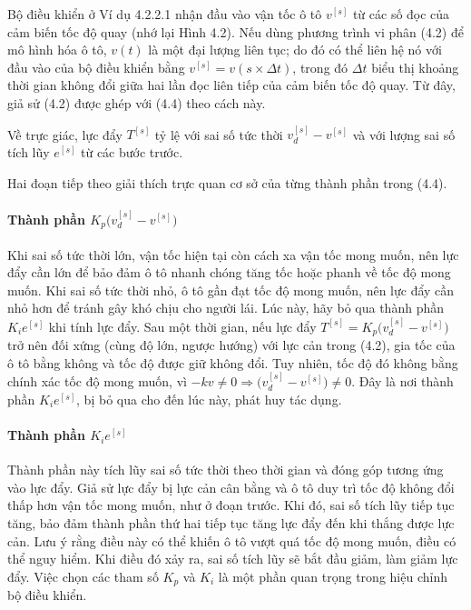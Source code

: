 Bộ điều khiển ở Ví dụ 4.2.2.1 nhận đầu vào vận tốc ô tô $v^{[s]}$ từ các số đọc của cảm biến tốc độ quay (nhớ lại Hình 4.2). Nếu dùng phương trình vi phân (4.2) để mô hình hóa ô tô, $v(t)$ là một đại lượng liên tục; do đó có thể liên hệ nó với đầu vào của bộ điều khiển bằng $v^{[s]}=v(s\times\Delta t)$, trong đó $\Delta t$ biểu thị khoảng thời gian không đổi giữa hai lần đọc liên tiếp của cảm biến tốc độ quay. Từ đây, giả sử (4.2) được ghép với (4.4) theo cách này.

Về trực giác, lực đẩy $T^{[s]}$ tỷ lệ với sai số tức thời $v_d^{[s]}-v^{[s]}$ và với lượng sai số tích lũy $e^{[s]}$ từ các bước trước.

Hai đoạn tiếp theo giải thích trực quan cơ sở của từng thành phần trong (4.4).

\paragraph{Thành phần $K_p\bigl(v_d^{[s]}-v^{[s]}\bigr)$}
Khi sai số tức thời lớn, vận tốc hiện tại còn cách xa vận tốc mong muốn, nên lực đẩy cần lớn để bảo đảm ô tô nhanh chóng tăng tốc hoặc phanh về tốc độ mong muốn. Khi sai số tức thời nhỏ, ô tô gần đạt tốc độ mong muốn, nên lực đẩy cần nhỏ hơn để tránh gây khó chịu cho người lái. Lúc này, hãy bỏ qua thành phần $K_i e^{[s]}$ khi tính lực đẩy. Sau một thời gian, nếu lực đẩy $T^{[s]}=K_p\bigl(v_d^{[s]}-v^{[s]}\bigr)$ trở nên đối xứng (cùng độ lớn, ngược hướng) với lực cản trong (4.2), gia tốc của ô tô bằng không và tốc độ được giữ không đổi. Tuy nhiên, tốc độ đó không bằng chính xác tốc độ mong muốn, vì $-kv\ne0\Longrightarrow\bigl(v_d^{[s]}-v^{[s]}\bigr)\ne0$. Đây là nơi thành phần $K_i e^{[s]}$, bị bỏ qua cho đến lúc này, phát huy tác dụng.

\paragraph{Thành phần $K_i e^{[s]}$}
Thành phần này tích lũy sai số tức thời theo thời gian và đóng góp tương ứng vào lực đẩy. Giả sử lực đẩy bị lực cản cân bằng và ô tô duy trì tốc độ không đổi thấp hơn vận tốc mong muốn, như ở đoạn trước. Khi đó, sai số tích lũy tiếp tục tăng, bảo đảm thành phần thứ hai tiếp tục tăng lực đẩy đến khi thắng được lực cản. Lưu ý rằng điều này có thể khiến ô tô vượt quá tốc độ mong muốn, điều có thể nguy hiểm. Khi điều đó xảy ra, sai số tích lũy sẽ bắt đầu giảm, làm giảm lực đẩy. Việc chọn các tham số $K_p$ và $K_i$ là một phần quan trọng trong hiệu chỉnh bộ điều khiển.

